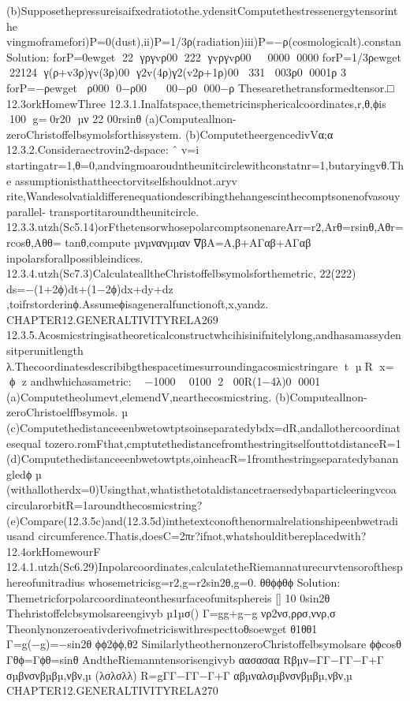 {{{{{{{{{{{{{{{{(b)Supposethepressureisaifxedratiotothe.ydensitComputethestressenergytensorinthe
vingmoframefori)P=0(dust),ii)P=1/3ρ(radiation)iii)P=−ρ(cosmologicalt).constan
Solution:
forP=0ewget
22
γργvρ00
222
γvργvρ00

0000
0000
forP=1/3ρewget
22124
γ(ρ+v3ρ)γv(3ρ)00
γ2v(4ρ)γ2(v2ρ+1ρ)00
331
003ρ0
0001ρ
3
forP=−ρewget
ρ000
0−ρ00

00−ρ0
000−ρ
Thesearethetransformedtensor.□
12.3orkHomewThree
12.3.1.Inalfatspace,themetricinsphericalcoordinates,r,θ,ϕis
100
g=0r20
µν
22
00rsinθ
(a)Computeallnon-zeroChristoffelbsymolsforthissystem.
(b)ComputetheergencedivVα;α
12.3.2.Consideraectrovin2-dspace:
ˆ
v=i
startingatr=1,θ=0,andvingmoaroudntheunitcirclewithconstatnr=1,butaryingvθ.The
assumptionisthattheectorvitselfshouldnot.aryv
rite,Wandesolvatialdifferenequationdescribingthehangescinthecomptsonenofvasouyparallel-
transportitaroundtheunitcircle.
12.3.3.utzh(Sc5.14)orFthetensorwhosepolarcomptsonenareArr=r2,Arθ=rsinθ,Aθr=rcosθ,Aθθ=
tanθ,compute
µνµνανµµαν
∇βA=A,β+AΓαβ+AΓαβ
inpolarsforallpossibleindices.
12.3.4.utzh(Sc7.3)CalculatealltheChristoffelbsymolsforthemetric,
22(222)
ds=−(1+2ϕ)dt+(1−2ϕ)dx+dy+dz
,toifrstorderinϕ.Assumeϕisageneralfunctionoft,x,yandz.
CHAPTER12.GENERALTIVITYRELA269
12.3.5.Acosmicstringisatheoreticalconstructwhcihisinifnitelylong,andhasamassydensitperunitlength
λ.Thecoordinatesdescribibgthespacetimesurroundingacosmicstringare
t
µR
x=
ϕ
z
andhwhichasametric:

−1000

0100
2
00R(1−4λ)0
0001
(a)Computetheolumevt,elemendV,nearthecosmicstring.
(b)Computeallnon-zeroChristoelffbsymols.
µ
(c)Computethedistanceeenbwetowtptsoinseparatedybdx=dR,andallothercoordinatesequal
tozero.romFthat,cmptutethedistancefromthestringitselfouttotdistanceR=1
(d)Computethedistanceeenbwetowtpts,oinheacR=1fromthestringseparatedybanangledϕ
µ
(withallotherdx=0)Usingthat,whatisthetotaldistancetraersedybaparticleeringvcoa
circularorbitR=1aroundthecosmicstring?
(e)Compare(12.3.5c)and(12.3.5d)inthetextconofthenormalrelationshipeenbwetradiusand
circumference.Thatis,doesC=2πr?ifnot,whatshoulditbereplacedwith?
12.4orkHomewourF
12.4.1.utzh(Sc6.29)Inpolarcoordinates,calculatetheRiemannaturecurvtensorofthesphereofunitradius
whosemetricisg=r2,g=r2sin2θ,g=0.
θθϕϕθϕ
Solution:
Themetricforpolarcoordinateonthesurfaceofunitsphereis
[]
10
0sin2θ
Thehristoffelcbsymolsareengivyb
µ1µσ()
Γ=gg+g−g
νρ2νσ,ρρσ,ννρ,σ
Theonlynonzeroeativderivofmetriciswithrespecttoθsoewget
θ1θθ1
Γ=g(−g)=−sin2θ
ϕϕ2ϕϕ,θ2
SimilarlytheothernonzeroChristoffelbsymolsare
ϕϕcosθ
Γθϕ=Γϕθ=sinθ
AndtheRiemanntensorisengivyb
αασασαα
Rβµν=ΓΓ−ΓΓ−Γ+Γ
σµβνσνβµβµ,νβν,µ
(λσλσλλ)
R=gΓΓ−ΓΓ−Γ+Γ
αβµναλσµβνσνβµβµ,νβν,µ
CHAPTER12.GENERALTIVITYRELA270
}}}}}}}}}}}}}}}}
